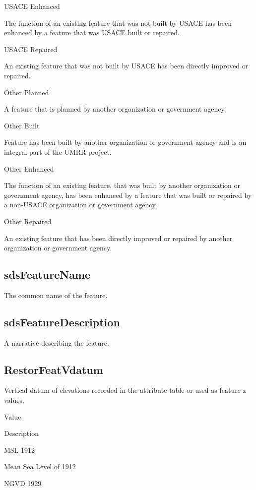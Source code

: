 \documentclass[
  letterpaper,
  DIV=11,
  numbers=noendperiod]{scrreprt}
\begin{document}
USACE Enhanced

The function of an existing feature that was not built by USACE has been
enhanced by a feature that was USACE built or repaired.

USACE Repaired

An existing feature that was not built by USACE has been directly
improved or repaired.

Other Planned

A feature that is planned by another organization or government agency.

Other Built

Feature has been built by another organization or government agency and
is an integral part of the UMRR project.

Other Enhanced

The function of an existing feature, that was built by another
organization or government agency, has been enhanced by a feature that
was built or repaired by a non-USACE organization or government agency.

Other Repaired

An existing feature that has been directly improved or repaired by
another organization or government agency.

\subsection{sdsFeatureName}\label{sdsfeaturename-16}

The common name of the feature.

\subsection{sdsFeatureDescription}\label{sdsfeaturedescription-16}

A narrative describing the feature.

\subsection{RestorFeatVdatum}\label{restorfeatvdatum-16}

Vertical datum of elevations recorded in the attribute table or used as
feature z values.

Value

Description

MSL 1912

Mean Sea Level of 1912

NGVD 1929
\end{document}
